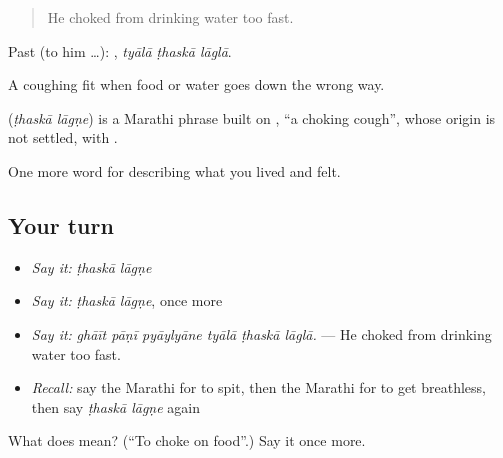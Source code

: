 \begin{quote}
He choked from drinking water too fast.
\end{quote}

Past (to him …):   , \emph{tyālā ṭhaskā lāglā}.

A coughing fit when food or water goes down the wrong way.

\begin{cousinweb}
\textbf{ } (\emph{ṭhaskā lāgṇe}) is a Marathi phrase built on , \textquotedblleft{}a choking cough\textquotedblright{}, whose origin is not settled, with .
\end{cousinweb}

\begin{grammarlens}[title={What you've built}]
One more word for describing what you lived and felt.
\end{grammarlens}

\subsection*{Your turn}
\begin{itemize}
\raggedright
  \item \emph{Say it:} \emph{ṭhaskā lāgṇe}
  \item \emph{Say it:} \emph{ṭhaskā lāgṇe}, once more
  \item \emph{Say it:} \emph{ghāīt pāṇī pyāylyāne tyālā ṭhaskā lāglā.} — He choked from drinking water too fast.
  \item \emph{Recall:} say the Marathi for to spit, then the Marathi for to get breathless, then say \emph{ṭhaskā lāgṇe} again
\end{itemize}

\begin{tcolorbox}[breakable,colback=teal!4,colframe=teal!35!black,title={Before you move on}]
What does   mean? (\textquotedblleft{}To choke on food\textquotedblright{}.) Say it once more.
\end{tcolorbox}
